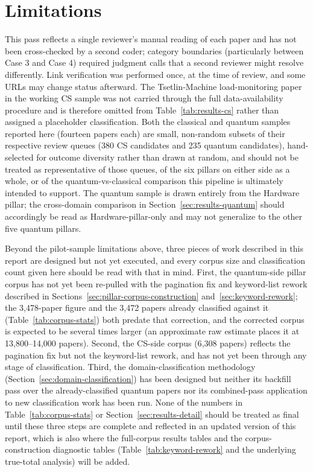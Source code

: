 \section{Limitations}

This pass reflects a single reviewer's manual reading of each paper and has not been
cross-checked by a second coder; category boundaries (particularly between Case 3 and
Case 4) required judgment calls that a second reviewer might resolve differently.
Link verification was performed once, at the time of review, and some URLs may change
status afterward. The Tsetlin-Machine load-monitoring paper in the working CS sample was
not carried through the full data-availability procedure and is therefore omitted from
Table~\ref{tab:results-cs} rather than assigned a placeholder classification. Both the
classical and quantum samples reported here (fourteen papers each) are small,
non-random subsets of their respective review queues (380 CS candidates and 235
quantum candidates), hand-selected for outcome diversity rather than drawn at random,
and should not be treated as representative of those queues, of the six pillars on
either side as a whole, or of the quantum-vs-classical comparison this pipeline is
ultimately intended to support. The quantum sample is drawn entirely from the Hardware
pillar; the cross-domain comparison in Section~\ref{sec:results-quantum} should
accordingly be read as Hardware-pillar-only and may not generalize to the other five
quantum pillars.

Beyond the pilot-sample limitations above, three pieces of work described in this
report are designed but not yet executed, and every corpus size and classification
count given here should be read with that in mind. First, the quantum-side pillar
corpus has not yet been re-pulled with the pagination fix and keyword-list rework
described in Sections~\ref{sec:pillar-corpus-construction}
and~\ref{sec:keyword-rework}; the 3{,}478-paper figure and the 3{,}472 papers already
classified against it (Table~\ref{tab:corpus-stats}) both predate that correction, and
the corrected corpus is expected to be several times larger (an approximate
raw estimate places it at 13{,}800--14{,}000 papers). Second, the CS-side corpus
(6{,}308 papers) reflects the pagination fix but not the keyword-list rework, and has
not yet been through any stage of classification. Third, the domain-classification
methodology (Section~\ref{sec:domain-classification}) has been designed but neither
its backfill pass over the already-classified quantum papers nor its combined-pass
application to new classification work has been run. None of the numbers in
Table~\ref{tab:corpus-stats} or Section~\ref{sec:results-detail} should be treated as
final until these three steps are complete and reflected in an updated version of this
report, which is also where the full-corpus results tables and the corpus-construction
diagnostic tables (Table~\ref{tab:keyword-rework} and the underlying true-total
analysis) will be added.
